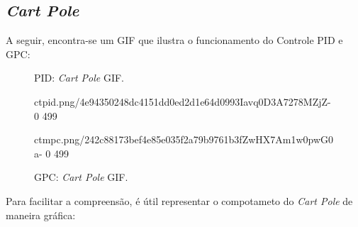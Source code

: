 \documentclass[12pt,           %
a4paper,                       %
openany,                       %
oneside,                       %
chapter=TITLE,                 %
english,                       %
spanish,                       %
brazil,                        %
sumario=tradicional]{abntex2}  %
\begin{document}
\begin{OnehalfSpace}
\section{\textit{Cart Pole}}

A seguir, encontra-se um GIF que ilustra o funcionamento do Controle PID e GPC:

\begin{figure}[H]
  \begin{minipage}{0.5\textwidth}
    \centering
    \caption{PID: \textit{Cart Pole} GIF.}
    {ctpid.png/4e94350248dc4151dd0ed2d1e64d0993Iavq0D3A7278MZjZ-}%
    {0}%
    {499}%
    \label{fig:GPC1}
  \end{minipage}
  \begin{minipage}{0.5\textwidth}
    \centering
    \caption{GPC: \textit{Cart Pole} GIF.}
    {ctmpc.png/242c88173bef4e85e035f2a79b9761b3fZwHX7Am1w0pwG0a-}%
    {0}%
    {499}%
    \label{fig:PID1}
  \end{minipage}
\end{figure}
\vspace*{-.7cm}
{\raggedright {}}

Para facilitar a compreensão, é útil representar o compotameto do \textit{Cart Pole} de maneira gráfica:


\end{OnehalfSpace}
\end{document}
